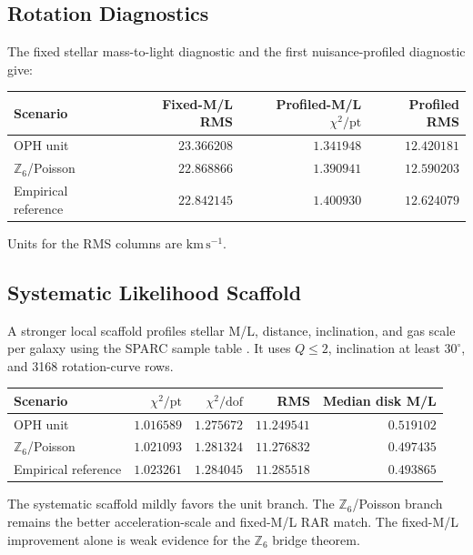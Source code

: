 \documentclass[11pt]{article}
\newcommand{\Zsix}{\mathbb Z_6}
\begin{document}
\subsection{Rotation Diagnostics}

The fixed stellar mass-to-light diagnostic and the first nuisance-profiled
diagnostic give:
\begin{center}
\begin{tabular}{@{}lrrr@{}}
\toprule
Scenario & Fixed-M/L RMS & Profiled-M/L \(\chi^2/\mathrm{pt}\) & Profiled RMS \\
\midrule
OPH unit & \(23.366208\) & \(1.341948\) & \(12.420181\) \\
\(\Zsix\)/Poisson & \(22.868866\) & \(1.390941\) & \(12.590203\) \\
Empirical reference & \(22.842145\) & \(1.400930\) & \(12.624079\) \\
\bottomrule
\end{tabular}
\end{center}
Units for the RMS columns are \(\mathrm{km\,s^{-1}}\).

\subsection{Systematic Likelihood Scaffold}

A stronger local scaffold profiles stellar M/L, distance, inclination, and gas
scale per galaxy using the SPARC sample table \cite{lelli2016,sparcpage}.  It
uses \(Q\le2\), inclination at least \(30^\circ\), and 3168 rotation-curve
rows.
\begin{center}
\begin{tabular}{@{}lrrrr@{}}
\toprule
Scenario & \(\chi^2/\mathrm{pt}\) & \(\chi^2/\mathrm{dof}\) & RMS & Median disk M/L \\
\midrule
OPH unit & \(1.016589\) & \(1.275672\) & \(11.249541\) & \(0.519102\) \\
\(\Zsix\)/Poisson & \(1.021093\) & \(1.281324\) & \(11.276832\) & \(0.497435\) \\
Empirical reference & \(1.023261\) & \(1.284045\) & \(11.285518\) & \(0.493865\) \\
\bottomrule
\end{tabular}
\end{center}
The systematic scaffold mildly favors the unit branch.  The \(\Zsix\)/Poisson
branch remains the better acceleration-scale and fixed-M/L RAR match.  The
fixed-M/L improvement alone is weak evidence for the \(\Zsix\) bridge theorem.
\end{document}
